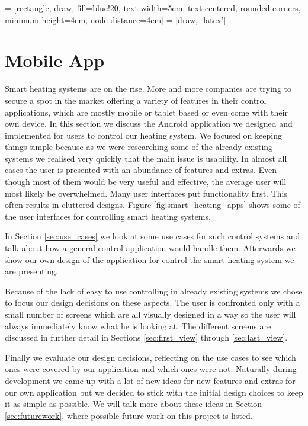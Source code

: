 
 = [rectangle, draw, fill=blue!20, 
    text width=5em, text centered, rounded corners, minimum height=4em, node distance=4cm]
 = [draw, -latex']

\chapter{Mobile App}
\label{sec:mobile_app}

Smart heating systems are on the rise. More and more companies are trying to secure a spot in the market offering a variety of features in their control applications, which are mostly mobile or tablet based or even come with their own device. In this section we discuss the Android application we designed and implemented for users to control our heating system. We focused on keeping things simple because as we were researching some of the already existing systems we realised very quickly that the main issue is usability. In almost all cases the user is presented with an abundance of features and extras. Even though most of them would be very useful and effective, the average user will most likely be overwhelmed. Many user interfaces put functionality first. This often results in cluttered designs. Figure \ref{fig:smart_heating_apps} shows some of the user interfaces for controlling smart heating systems.

In Section \ref{sec:use_cases} we look at some use cases for such control systems and talk about how a general control application would handle them. Afterwards we show our own design of the application for control the smart heating system we are presenting.

Because of the lack of easy to use controlling in already existing systems we chose to focus our design decisions on these aspects. The user is confronted only with a small number of screens which are all visually designed in a way so the user will always immediately know what he is looking at. The different screens are discussed in further detail in Sections \ref{sec:first_view} through \ref{sec:last_view}.

Finally we evaluate our design decisions, reflecting on the use cases to see which ones were covered by our application and which ones were not. Naturally during development we came up with a lot of new ideas for new features and extras for our own application but we decided to stick with the initial design choices to keep it as simple as possible. We will talk more about these ideas in Section \ref{sec:futurework}, where possible future work on this project is listed.

